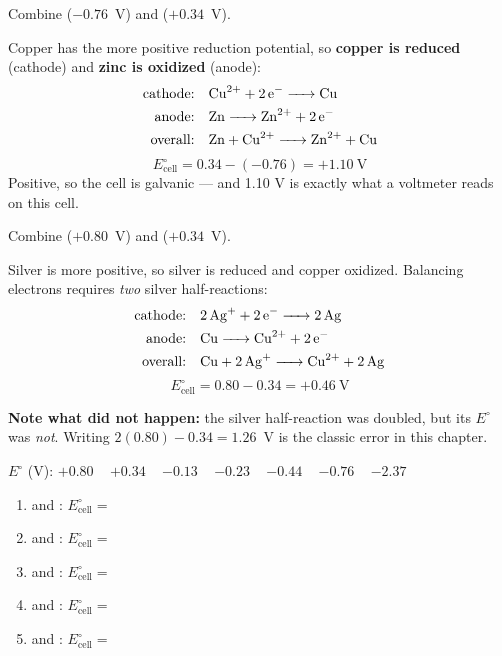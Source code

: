 \documentclass{apchem-notes}
\begin{document}
\begin{workedexample}
Combine  ($-0.76$~V) and  ($+0.34$~V).

Copper has the more positive reduction potential, so \textbf{copper is
reduced} (cathode) and \textbf{zinc is oxidized} (anode):
\begin{align*}
  \text{cathode:} &\quad \ce{Cu^2+ + 2e^- -> Cu} \\
  \text{anode:}   &\quad \ce{Zn -> Zn^2+ + 2e^-} \\
  \text{overall:} &\quad \ce{Zn + Cu^2+ -> Zn^2+ + Cu}
\end{align*}
\[ E^\circ_{\text{cell}} = 0.34 - (-0.76) = \mathbf{+1.10}~\text{V} \]
Positive, so the cell is galvanic --- and 1.10 V is exactly what a
voltmeter reads on this cell.
\end{workedexample}

\begin{workedexample}
Combine  ($+0.80$~V) and  ($+0.34$~V).

Silver is more positive, so silver is reduced and copper oxidized. Balancing
electrons requires \emph{two} silver half-reactions:
\begin{align*}
  \text{cathode:} &\quad \ce{2Ag+ + 2e^- -> 2Ag} \\
  \text{anode:}   &\quad \ce{Cu -> Cu^2+ + 2e^-} \\
  \text{overall:} &\quad \ce{Cu + 2Ag+ -> Cu^2+ + 2Ag}
\end{align*}
\[ E^\circ_{\text{cell}} = 0.80 - 0.34 = \mathbf{+0.46}~\text{V} \]

\textbf{Note what did not happen:} the silver half-reaction was doubled, but
its $E^\circ$ was \emph{not}. Writing $2(0.80) - 0.34 = 1.26$~V is the
classic error in this chapter.
\end{workedexample}


$E^\circ$ (V):  $+0.80$ \textbullet\  $+0.34$
\textbullet\  $-0.13$ \textbullet\  $-0.23$
\textbullet\  $-0.44$ \textbullet\  $-0.76$
\textbullet\  $-2.37$

\begin{enumerate}[leftmargin=*,itemsep=0.35em]
  \item {} and : $E^\circ_{\text{cell}} = $
  \item {} and : $E^\circ_{\text{cell}} = $
  \item {} and : $E^\circ_{\text{cell}} = $
  \item {} and : $E^\circ_{\text{cell}} = $
  \item {} and : $E^\circ_{\text{cell}} = $
\end{enumerate}
\end{document}

